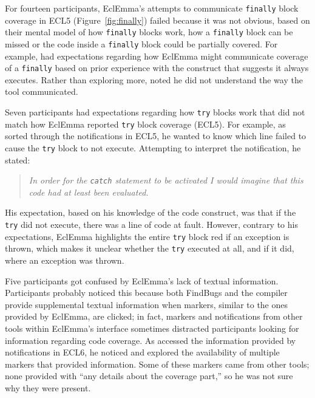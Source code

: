 For fourteen participants, EclEmma's attempts to communicate \texttt{finally} block coverage in ECL5 (Figure~\ref{fig:finally}) failed because it was not obvious, based on their mental model of how \texttt{finally} blocks work, how a \texttt{finally} block can be missed or the code inside a \texttt{finally} block could be partially covered. For example,  had expectations regarding how EclEmma might communicate coverage of a \texttt{finally} based on prior experience with the construct that suggests it always executes. Rather than exploring more,  noted he did not understand the way the tool communicated. 

Seven participants had expectations regarding how \texttt{try} blocks work that did not match how EclEmma reported \texttt{try} block coverage (ECL5).
For example, as  sorted through the notifications in ECL5, he wanted to know which line failed to cause the \texttt{try} block to not execute.
Attempting to interpret the notification, he stated:

\begin{quote}
	\textit{In order for the \texttt{catch} statement to be activated I would imagine that this code had at least been evaluated.}
\end{quote}

\noindent
His expectation, based on his knowledge of the code construct, was that if the \texttt{try} did not execute, there was a line of code at fault. However, contrary to his expectations, EclEmma highlights the entire \texttt{try} block red if an exception is thrown, which makes it unclear whether the \texttt{try} executed at all, and if it did, where an exception was thrown.

Five participants got confused by EclEmma's lack of textual information.
Participants probably noticed this because both FindBugs and the compiler provide supplemental textual information when markers, similar to the ones provided by EclEmma, are clicked; in fact, markers and notifications from other tools within EclEmma's interface sometimes distracted participants looking for information regarding code coverage.
As  accessed the information provided by notifications in ECL6, he noticed and explored the availability of multiple markers that provided information. Some of these markers came from other tools; none provided  with ``any details about the coverage part,'' so he was not sure why they were present.



